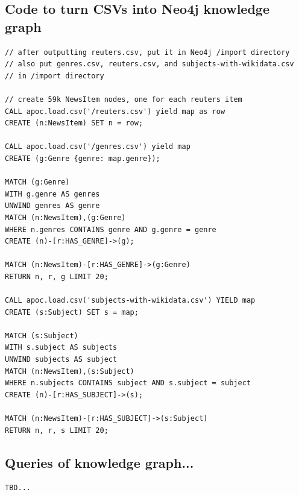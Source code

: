 \documentclass[11pt]{article}
\begin{document}
\subsection{Code to turn CSVs into Neo4j knowledge graph}
\label{sec:AppendixC}
\begin{lstlisting}
// after outputting reuters.csv, put it in Neo4j /import directory
// also put genres.csv, reuters.csv, and subjects-with-wikidata.csv
// in /import directory

// create 59k NewsItem nodes, one for each reuters item
CALL apoc.load.csv('/reuters.csv') yield map as row
CREATE (n:NewsItem) SET n = row;

CALL apoc.load.csv('/genres.csv') yield map
CREATE (g:Genre {genre: map.genre});

MATCH (g:Genre)
WITH g.genre AS genres
UNWIND genres AS genre
MATCH (n:NewsItem),(g:Genre)
WHERE n.genres CONTAINS genre AND g.genre = genre
CREATE (n)-[r:HAS_GENRE]->(g);

MATCH (n:NewsItem)-[r:HAS_GENRE]->(g:Genre)
RETURN n, r, g LIMIT 20;

CALL apoc.load.csv('subjects-with-wikidata.csv') YIELD map
CREATE (s:Subject) SET s = map;

MATCH (s:Subject)
WITH s.subject AS subjects
UNWIND subjects AS subject
MATCH (n:NewsItem),(s:Subject)
WHERE n.subjects CONTAINS subject AND s.subject = subject
CREATE (n)-[r:HAS_SUBJECT]->(s);

MATCH (n:NewsItem)-[r:HAS_SUBJECT]->(s:Subject)
RETURN n, r, s LIMIT 20;
\end{lstlisting}
\newpage


\subsection{Queries of knowledge graph...}
\label{sec:AppendixQuery}
\begin{lstlisting}
TBD...
\end{lstlisting}

\newpage


\end{document}

